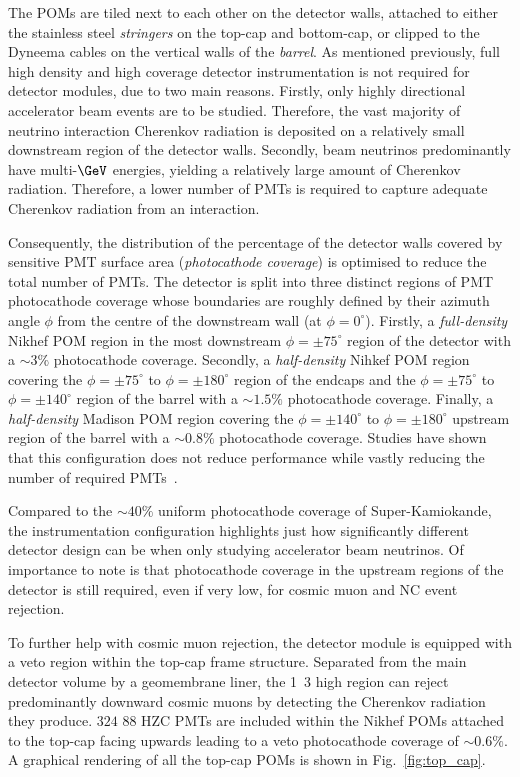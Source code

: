 The POMs are tiled next to each other on the detector walls, attached to either the stainless
steel \emph{stringers} on the top-cap and bottom-cap, or clipped to the Dyneema cables on the
vertical walls of the \emph{barrel}. As mentioned previously, full high density and high coverage
detector instrumentation is not required for \chips detector modules, due to two main reasons.
Firstly, only highly directional accelerator beam events are to be studied. Therefore, the vast
majority of neutrino interaction Cherenkov radiation is deposited on a relatively small downstream
region of the detector walls. Secondly, beam neutrinos predominantly have multi-$\GeV$ energies,
yielding a relatively large amount of Cherenkov radiation. Therefore, a lower number of PMTs is
required to capture adequate Cherenkov radiation from an interaction.

Consequently, the distribution of the percentage of the detector walls covered by sensitive PMT
surface area (\emph{photocathode coverage}) is optimised to reduce the total number of PMTs. The
detector is split into three distinct regions of PMT photocathode coverage whose boundaries are
roughly defined by their azimuth angle $\phi$ from the centre of the downstream wall (at
$\phi=0^{\circ}$). Firstly, a \emph{full-density} Nikhef POM region in the most downstream
$\phi=\pm75^{\circ}$ region of the detector with a $\sim3\%$ photocathode coverage. Secondly, a
\emph{half-density} Nihkef POM region covering the $\phi=\pm75^{\circ}$ to $\phi=\pm180^{\circ}$
region of the endcaps and the $\phi=\pm75^{\circ}$ to $\phi=\pm140^{\circ}$ region of the barrel
with a $\sim1.5\%$ photocathode coverage. Finally, a \emph{half-density} Madison POM region
covering the $\phi=\pm140^{\circ}$ to $\phi=\pm180^{\circ}$ upstream region of the barrel with a
$\sim0.8\%$ photocathode coverage. Studies have shown that this configuration does not reduce
performance while vastly reducing the number of required PMTs~\cite{blake2016}.

Compared to the $\sim40\%$ uniform photocathode coverage of Super-Kamiokande, the \chipsfive
instrumentation configuration highlights just how significantly different detector design can be
when only studying accelerator beam neutrinos. Of importance to note is that photocathode coverage
in the upstream regions of the detector is still required, even if very low, for cosmic muon and
NC event rejection.

To further help with cosmic muon rejection, the \chipsfive detector module is equipped with a veto
region within the top-cap frame structure. Separated from the main detector volume by a
geomembrane liner, the \unit{1.3}{} high region can reject predominantly downward cosmic
muons by detecting the Cherenkov radiation they produce. $324$ \unit{88}{} HZC PMTs are
included within the Nikhef POMs attached to the top-cap facing upwards leading to a veto
photocathode coverage of $\sim0.6\%$. A graphical rendering of all the top-cap POMs is shown in
Fig.~\ref{fig:top_cap}.

